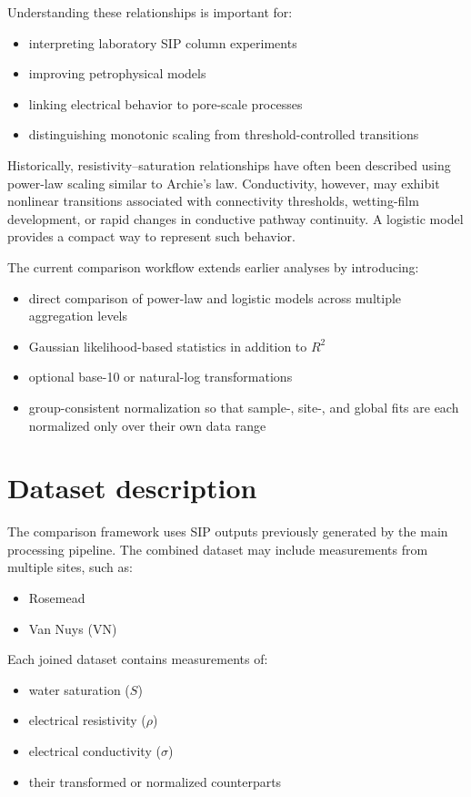 \documentclass[11pt]{article}
\begin{document}
Understanding these relationships is important for:

\begin{itemize}[leftmargin=1.5em]
\item interpreting laboratory SIP column experiments
\item improving petrophysical models
\item linking electrical behavior to pore-scale processes
\item distinguishing monotonic scaling from threshold-controlled transitions
\end{itemize}

Historically, resistivity--saturation relationships have often been described using power-law scaling similar to Archie's law. Conductivity, however, may exhibit nonlinear transitions associated with connectivity thresholds, wetting-film development, or rapid changes in conductive pathway continuity. A logistic model provides a compact way to represent such behavior.

The current comparison workflow extends earlier analyses by introducing:
\begin{itemize}[leftmargin=1.5em]
\item direct comparison of power-law and logistic models across multiple aggregation levels
\item Gaussian likelihood-based statistics in addition to $R^2$
\item optional base-10 or natural-log transformations
\item group-consistent normalization so that sample-, site-, and global fits are each normalized only over their own data range
\end{itemize}

\section{Dataset description}

The comparison framework uses SIP outputs previously generated by the main processing pipeline. The combined dataset may include measurements from multiple sites, such as:

\begin{itemize}[leftmargin=1.5em]
\item Rosemead
\item Van Nuys (VN)
\end{itemize}

Each joined dataset contains measurements of:
\begin{itemize}[leftmargin=1.5em]
\item water saturation ($S$)
\item electrical resistivity ($\rho$)
\item electrical conductivity ($\sigma$)
\item their transformed or normalized counterparts
\end{itemize}
\end{document}
